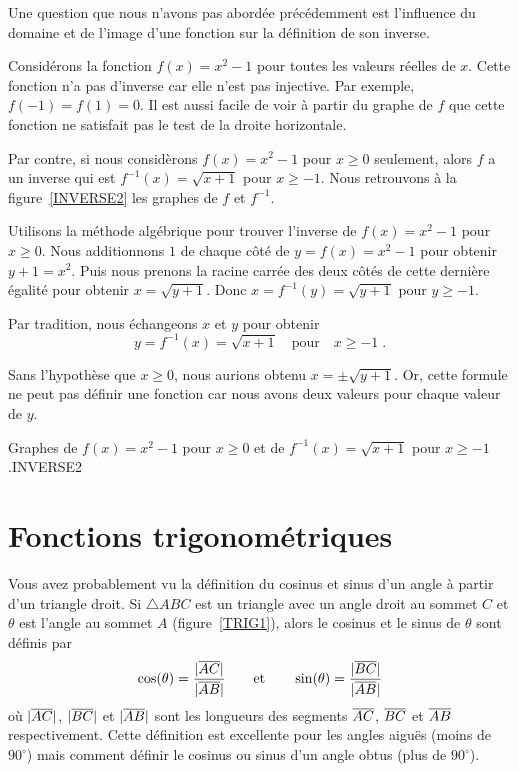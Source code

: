 {Une question que nous n'avons pas abordée précédemment est l'influence du
domaine et de l'image d'une fonction sur la définition de son
inverse.

\begin{egg}
Considérons la fonction $f(x) = x^2 -1$ pour toutes les valeurs
réelles de $x$.  Cette fonction n'a pas d'inverse car elle n'est pas
injective.  Par exemple, $f(-1) = f(1) = 0$.  Il est aussi facile de
voir à partir du graphe de $f$ que cette fonction ne satisfait pas le
test de la droite horizontale.

Par contre, si nous considèrons $f(x) = x^2-1$ pour $x\geq 0$ seulement,
alors $f$ a un inverse qui est $f^{-1}(x) = \sqrt{x+1}$ pour
$x\geq -1$.  Nous retrouvons à la figure~\ref{INVERSE2} les graphes de
$f$ et $f^{-1}$.

Utilisons la méthode algébrique pour trouver l'inverse de
$f(x) = x^2-1$ pour $x\geq 0$.  Nous additionnons $1$ de chaque
côté de $y = f(x) = x^2 -1$ pour obtenir $y + 1 =  x^2$.
Puis nous prenons la racine carrée des deux côtés de cette dernière
égalité pour obtenir $x = \sqrt{y + 1}$.
Donc $x = f^{-1}(y) = \sqrt{y+1}$ pour $y \geq -1$.

Par tradition, nous échangeons $x$ et $y$ pour obtenir
\[
y = f^{-1}(x) = \sqrt{x + 1} \quad \text{pour} \quad x\geq -1 \; .
\]

Sans l'hypothèse que $x\geq 0$, nous aurions obtenu
$\displaystyle x = \pm \sqrt{y + 1}$.  Or, cette formule ne peut pas
définir une fonction car nous avons deux valeurs pour chaque valeur de $y$.
\end{egg}

{Graphes de $f(x) = x^2 -1$ pour $x\geq 0$ et de
$f^{-1}(x) = \sqrt{x+1}$ pour $x\geq -1$.}{INVERSE2}

\section{Fonctions trigonométriques \life \eng}

Vous avez probablement vu la définition du cosinus et sinus d'un angle
à partir d'un triangle droit.  Si $\triangle ABC$ est un triangle avec
un angle droit au sommet $C$ et $\theta$ est l'angle au sommet $A$
(figure~\ref{TRIG1}), alors le cosinus et le sinus de $\theta$
sont définis par
\[
\cos(\theta) = \frac{|\overline{AC}|}{|\overline{AB}|}
\qquad \text {et} \qquad
\sin(\theta) = \frac{|\overline{BC}|}{|\overline{AB}|}
\]
où $|\overline{AC}|$, $|\overline{BC}|$ et $|\overline{AB}|$ sont les longueurs des
segments $\overline{AC}$, $\overline{BC}$ et $\overline{AB}$ respectivement.  Cette
définition est excellente pour les angles aiguës (moins de
$90^\circ$) mais comment définir le cosinus ou sinus d'un angle obtus
(plus de $90^\circ$).

}
